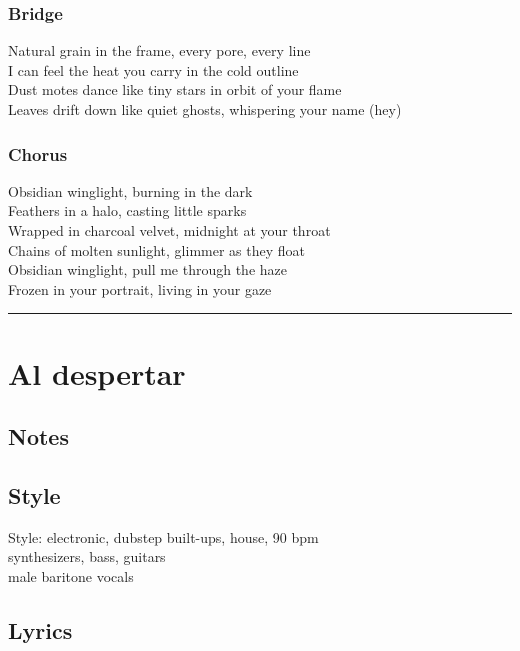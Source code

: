 \subsubsection{Bridge}\label{bridge-7}

Natural grain in the frame, every pore, every line\\
I can feel the heat you carry in the cold outline\\
Dust motes dance like tiny stars in orbit of your flame\\
Leaves drift down like quiet ghosts, whispering your name (hey)

\subsubsection{Chorus}\label{chorus-23}

Obsidian winglight, burning in the dark\\
Feathers in a halo, casting little sparks\\
Wrapped in charcoal velvet, midnight at your throat\\
Chains of molten sunlight, glimmer as they float\\
Obsidian winglight, pull me through the haze\\
Frozen in your portrait, living in your gaze

\begin{center}\rule{0.5\linewidth}{0.5pt}\end{center}

\section{Al despertar}\label{al-despertar}

\subsection{Notes}\label{notes-17}

\subsection{Style}\label{style-16}

Style: electronic, dubstep built-ups, house, 90 bpm\\
synthesizers, bass, guitars\\
male baritone vocals

\subsection{Lyrics}\label{lyrics-16}

